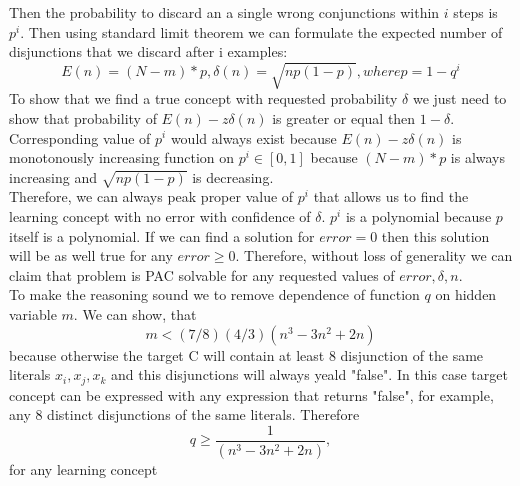 Then the probability to discard an a single wrong conjunctions within $i$ steps is $p^i$. Then using standard limit theorem we can formulate the expected number of disjunctions that we discard after i examples:
\[
E(n) = (N - m)*p, \delta(n) = \sqrt{np(1-p)}, where p = 1 - q^i
\] 
To show that we find a true concept with requested probability $\delta$ we just need to show that probability of $E(n) - z\delta(n)$ is greater or equal then $1-\delta$. Corresponding value of $p^i$ would always exist because $E(n) - z\delta(n)$ is monotonously increasing function on $p^i \in [0, 1]$ because $(N - m)*p$ is always increasing and $\sqrt{np(1-p)}$ is decreasing.
\[
\]
Therefore, we can always peak proper value of $p^i$ that allows us to find the learning concept with no error with confidence of $\delta$. $p^i$ is a polynomial because $p$ itself is a polynomial. If we can find a solution for $error = 0$ then this solution will be as well true for any $error  \geq 0$. Therefore, without loss of generality we can claim that problem is PAC solvable for any requested values of $error, \delta, n$.
\[
\]
To make the reasoning sound we to remove dependence of function $q$ on hidden variable $m$. We can show, that 
\[
m < (7/8)(4/3)(n^3-3n^2+2n)
\]
because otherwise the target C will contain at least 8 disjunction of the same literals $x_i, x_j, x_k$ and this disjunctions will always yeald "false". In this case target concept can be expressed with any expression that returns "false", for example, any 8 distinct disjunctions of the same literals. Therefore
\[
q \geq \frac{1}{(n^3-3n^2+2n)},
\]
for any learning concept
